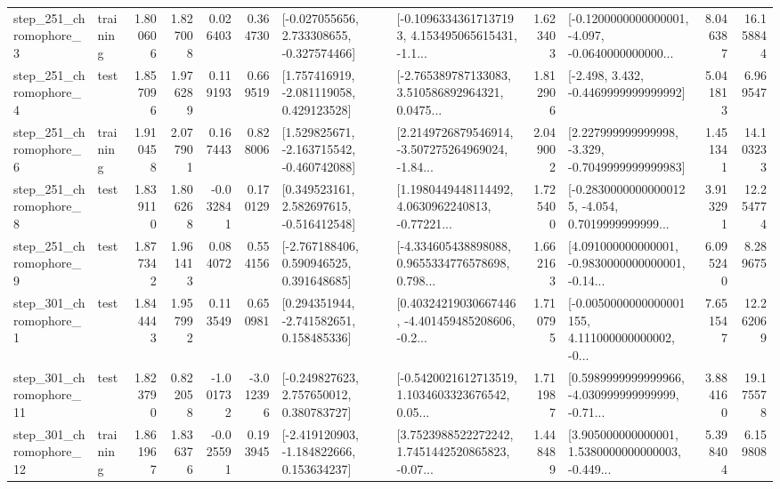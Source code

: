 \begin{tabular}{llrrrrllrlrr}
   step\_251\_chromophore\_3 &  training &      1.800606 &    1.827008 &      0.026403 &  0.364730 &   [-0.027055656, 2.733308655, -0.327574466] &  [-0.10963343617137193, 4.153495065615431, -1.1... &       1.623403 &  [-0.1200000000000001, -4.097, -0.0640000000000... &            8.046387 &         16.158844 \\
   step\_251\_chromophore\_4 &      test &      1.857096 &    1.976289 &      0.119193 &  0.669519 &    [1.757416919, -2.081119058, 0.429123528] &  [-2.765389787133083, 3.510586892964321, 0.0475... &       1.812906 &               [-2.498, 3.432, -0.4469999999999992] &            5.041813 &          6.969547 \\
   step\_251\_chromophore\_6 &  training &      1.910458 &    2.077901 &      0.167443 &  0.828006 &   [1.529825671, -2.163715542, -0.460742088] &  [2.2149726879546914, -3.507275264969024, -1.84... &       2.049002 &   [2.227999999999998, -3.329, -0.7049999999999983] &            1.451341 &         14.103233 \\
   step\_251\_chromophore\_8 &      test &      1.839110 &    1.806268 &     -0.032841 &  0.170129 &    [0.349523161, 2.582697615, -0.516412548] &  [1.1980449448114492, 4.0630962240813, -0.77221... &       1.725400 &  [-0.28300000000000125, -4.054, 0.7019999999999... &            3.913291 &         12.254774 \\
   step\_251\_chromophore\_9 &      test &      1.877342 &    1.961413 &      0.084072 &  0.554156 &    [-2.767188406, 0.590946525, 0.391648685] &  [-4.334605438898088, 0.9655334776578698, 0.798... &       1.662163 &  [4.091000000000001, -0.9830000000000001, -0.14... &            6.095240 &          8.289675 \\
   step\_301\_chromophore\_1 &      test &      1.844443 &    1.957992 &      0.113549 &  0.650981 &    [0.294351944, -2.741582651, 0.158485336] &  [0.40324219030667446, -4.401459485208606, -0.2... &       1.710795 &  [-0.0050000000000001155, 4.111000000000002, -0... &            7.651547 &         12.262069 \\
  step\_301\_chromophore\_11 &      test &      1.823790 &    0.822058 &     -1.001732 & -3.012396 &    [-0.249827623, 2.757650012, 0.380783727] &  [-0.5420021612713519, 1.1034603323676542, 0.05... &       1.711987 &  [0.5989999999999966, -4.030999999999999, -0.71... &            3.884160 &         19.175578 \\
  step\_301\_chromophore\_12 &  training &      1.861967 &    1.836376 &     -0.025591 &  0.193945 &   [-2.419120903, -1.184822666, 0.153634237] &  [3.7523988522272242, 1.7451442520865823, -0.07... &       1.448489 &  [3.905000000000001, 1.5380000000000003, -0.449... &            5.398404 &          6.159808 \\

\end{tabular}
